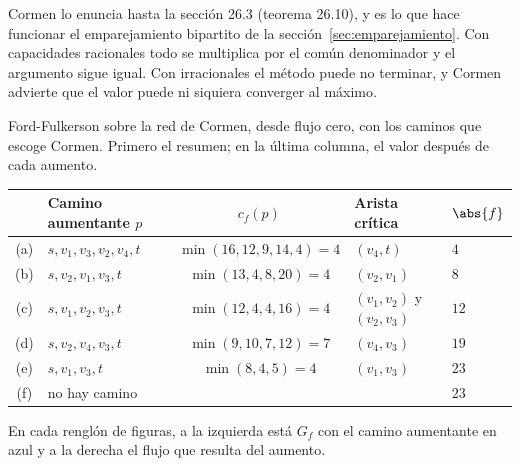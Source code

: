 \documentclass[11pt,letterpaper]{article}
\begin{document}
Cormen lo enuncia hasta la sección 26.3 (teorema 26.10), y es lo que
hace funcionar el emparejamiento bipartito de la
sección~\ref{sec:emparejamiento}. Con capacidades racionales todo se
multiplica por el común denominador y el argumento sigue igual. Con
irracionales el método puede no terminar, y Cormen advierte que el
valor puede ni siquiera converger al máximo.

\begin{ejemplo}\label{ej:flujo-ff266}
  Ford-Fulkerson sobre la red de Cormen, desde flujo cero, con los
  caminos que escoge Cormen. Primero el resumen; en la última columna,
  el valor después de cada aumento.
  \begin{center}
  \small
  \begin{tabular}{clcll}
    \toprule
    & \textbf{Camino aumentante $p$} & $c_f(p)$
      & \textbf{Arista crítica} & $\abs{f}$ \\
    \midrule
    (a) & $s, v_1, v_3, v_2, v_4, t$ & $\min(16, 12, 9, 14, 4) = 4$
        & $(v_4, t)$ & $4$ \\
    (b) & $s, v_2, v_1, v_3, t$ & $\min(13, 4, 8, 20) = 4$
        & $(v_2, v_1)$ & $8$ \\
    (c) & $s, v_1, v_2, v_3, t$ & $\min(12, 4, 4, 16) = 4$
        & $(v_1, v_2)$ y $(v_2, v_3)$ & $12$ \\
    (d) & $s, v_2, v_4, v_3, t$ & $\min(9, 10, 7, 12) = 7$
        & $(v_4, v_3)$ & $19$ \\
    (e) & $s, v_1, v_3, t$ & $\min(8, 4, 5) = 4$
        & $(v_1, v_3)$ & $23$ \\
    (f) & no hay camino & & & $23$ \\
    \bottomrule
  \end{tabular}
  \end{center}
  En cada renglón de figuras, a la izquierda está $G_f$ con el camino
  aumentante en azul y a la derecha el flujo que resulta del aumento.


\end{ejemplo}
\end{document}
